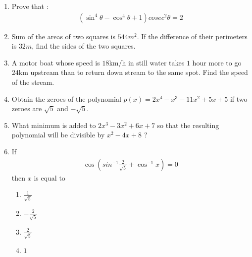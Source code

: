 \documentclass[12pt]{article}
\providecommand{\brak}[1]{\ensuremath{\left(#1\right)}}
\begin{document}
\begin{enumerate}
\item Prove that : 
        \begin{align}
           (\sin^{4}{\theta} - \cos^{4}{\theta} + 1)cosec^{2}{\theta} = 2 
        \end{align}
  
\item
	Sum of the areas of two squares is $544 m^2$. If the difference of their
perimeters is $32 m$, find the sides of the two squares.

\item
	A motor boat whose speed is $18$km/h in still water takes $1$ hour more to 
go $24$km upstream than to return down stream to the same spot. Find the speed of the stream.

\item Obtain the zeroes of the polynomial
$p(x) = 2x^4 - x^3 - 11x^2 + 5x + 5$ if two zeroes are $\sqrt5$ and $-\sqrt5$.

\item What minimum is added to $2x^3 - 3x^2 + 6x + 7$ so that the resulting
polynomial will be divisible by $x^2 - 4x + 8$ ?

\item
If
\begin{align}
\cos\brak{sin^{-1}{\frac{2}{\sqrt{5}}} + \cos^{-1}{x}} = 0
\end{align}
then $x$ is equal to
\begin{enumerate}[label=(\Alph*)]
	\item $\frac{1}{\sqrt{5}}$
	\item $-\frac{2}{\sqrt{5}}$
	\item $\frac{2}{\sqrt{5}}$
        \item $1$
\end{enumerate}
\end{enumerate}

	
\end{document}
